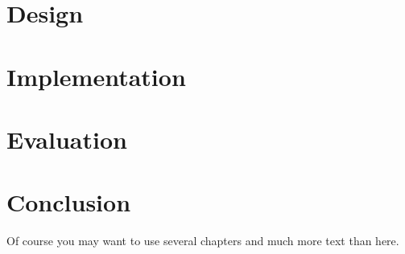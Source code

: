 \documentclass[bsc,logo,frontabs,twoside,singlespacing,normalheadings,parskip]{infthesis}     %
\begin{document}


\chapter{Design}




\chapter{Implementation}




\chapter{Evaluation}




\chapter{Conclusion}

Of course
you may want to use several chapters and much more text than here.



\end{document}
